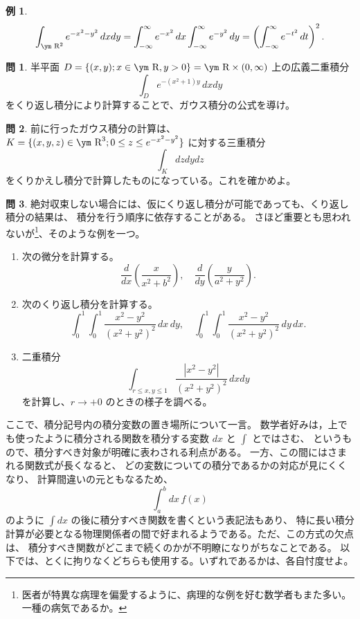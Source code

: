 \documentclass[a4paper]{jsarticle}
\theoremstyle{definition}
\newtheorem{Example}[Theorem]{例}
\newtheorem{Exercise}{問}%
\theoremstyle{remark}
\newcommand{\R}{\text{\ym R}}
\begin{document}
\begin{Example}
\[
\int_{\R^2} e^{-x^2-y^2}\, dxdy 
= \int_{-\infty}^\infty e^{-x^2}\, dx 
\int_{-\infty}^\infty e^{-y^2}\, dy 
= \left( 
\int_{-\infty}^\infty e^{-t^2}\, dt 
\right)^2. 
\]
\end{Example}

\begin{Exercise}
半平面 $D = \{ (x,y); x \in \R, y > 0 \} = \R\times (0,\infty)$ 上の広義二重積分
\[
\int_D e^{-(x^2+1)y}\, dxdy
\]
をくり返し積分により計算することで、ガウス積分の公式を導け。
\end{Exercise} 

\begin{Exercise}
前に行ったガウス積分の計算は、
$K = \{ (x,y,z) \in \R^3; 0 \leq z \leq e^{-x^2-y^2} \}$ に対する三重積分
\[
\int_K dzdydz
\]
をくりかえし積分で計算したものになっている。これを確かめよ。
\end{Exercise} 

\begin{Exercise}
絶対収束しない場合には、仮にくり返し積分が可能であっても、くり返し積分の結果は、
積分を行う順序に依存することがある。
さほど重要とも思われないが\footnote{医者が特異な病理を偏愛するように、病理的な例を好む数学者もまた多い。
一種の病気であるか。}、そのような例を一つ。

\begin{enumerate}
\item 
次の微分を計算する。
\[
\frac{d}{dx} \left( \frac{x}{x^2 + b^2} \right), 
\quad
\frac{d}{dy} \left( \frac{y}{a^2 + y^2}\right).  
\]
\item 
次のくり返し積分を計算する。
\[
\int_0^1 \int_0^1 \frac{x^2-y^2}{(x^2+y^2)^2}\, dx\, dy, 
\quad  
\int_0^1 \int_0^1 \frac{x^2-y^2}{(x^2+y^2)^2}\, dy\, dx. 
\]
\item 
二重積分
\[
\int_{r \leq x,y \leq 1} \frac{|x^2-y^2|}{(x^2+y^2)^2}\, dxdy 
\]
を計算し、$r \to +0$ のときの様子を調べる。
\end{enumerate}
\end{Exercise}

ここで、積分記号内の積分変数の置き場所について一言。
数学者好みは，上でも使ったように積分される関数を積分する変数 $dx$ と $\int$ とではさむ、
というもので、積分すべき対象が明確に表わされる利点がある。
一方、この間にはさまれる関数式が長くなると、
どの変数についての積分であるかの対応が見にくくなり、
計算間違いの元ともなるため、
\[
\int_a^b dx\, f(x)
\]
のように $\int dx$ の後に積分すべき関数を書くという表記法もあり、
特に長い積分計算が必要となる物理関係者の間で好まれるようである。ただ、この方式の欠点は、
積分すべき関数がどこまで続くのかが不明瞭になりがちなことである。
以下では、とくに拘りなくどちらも使用する。いずれであるかは、各自忖度せよ。
\end{document}
